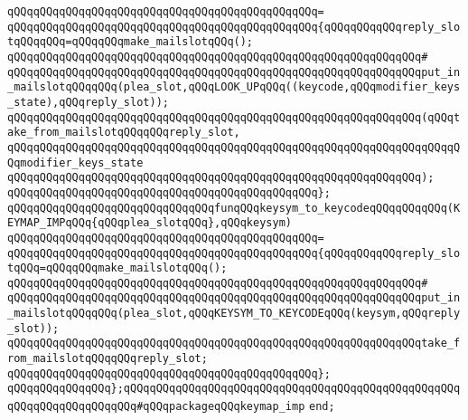 \verb|qQQqqQQqqQQqqQQqqQQqqQQqqQQqqQQqqQQqqQQqqQQqqQQq=|\newline
\verb|qQQqqQQqqQQqqQQqqQQqqQQqqQQqqQQqqQQqqQQqqQQqqQQq{qQQqqQQqqQQqreply_slotqQQqqQQq=qQQqqQQqmake_mailslotqQQq();|\newline
\verb|qQQqqQQqqQQqqQQqqQQqqQQqqQQqqQQqqQQqqQQqqQQqqQQqqQQqqQQqqQQqqQQq#|\newline
\verb|qQQqqQQqqQQqqQQqqQQqqQQqqQQqqQQqqQQqqQQqqQQqqQQqqQQqqQQqqQQqqQQqput_in_mailslotqQQqqQQq(plea_slot,qQQqLOOK_UPqQQq((keycode,qQQqmodifier_keys_state),qQQqreply_slot));|\newline
\newline
\verb|qQQqqQQqqQQqqQQqqQQqqQQqqQQqqQQqqQQqqQQqqQQqqQQqqQQqqQQqqQQqqQQq(qQQqtake_from_mailslotqQQqqQQqreply_slot,|\newline
\verb|qQQqqQQqqQQqqQQqqQQqqQQqqQQqqQQqqQQqqQQqqQQqqQQqqQQqqQQqqQQqqQQqqQQqqQQqmodifier_keys_state|\newline
\verb|qQQqqQQqqQQqqQQqqQQqqQQqqQQqqQQqqQQqqQQqqQQqqQQqqQQqqQQqqQQqqQQq);|\newline
\verb|qQQqqQQqqQQqqQQqqQQqqQQqqQQqqQQqqQQqqQQqqQQqqQQq};|\newline
\newline
\verb|qQQqqQQqqQQqqQQqqQQqqQQqqQQqqQQqfunqQQqkeysym_to_keycodeqQQqqQQqqQQq(KEYMAP_IMPqQQq{qQQqplea_slotqQQq},qQQqkeysym)|\newline
\verb|qQQqqQQqqQQqqQQqqQQqqQQqqQQqqQQqqQQqqQQqqQQqqQQq=|\newline
\verb|qQQqqQQqqQQqqQQqqQQqqQQqqQQqqQQqqQQqqQQqqQQqqQQq{qQQqqQQqqQQqreply_slotqQQq=qQQqqQQqmake_mailslotqQQq();|\newline
\verb|qQQqqQQqqQQqqQQqqQQqqQQqqQQqqQQqqQQqqQQqqQQqqQQqqQQqqQQqqQQqqQQq#|\newline
\verb|qQQqqQQqqQQqqQQqqQQqqQQqqQQqqQQqqQQqqQQqqQQqqQQqqQQqqQQqqQQqqQQqput_in_mailslotqQQqqQQq(plea_slot,qQQqKEYSYM_TO_KEYCODEqQQq(keysym,qQQqreply_slot));|\newline
\newline
\verb|qQQqqQQqqQQqqQQqqQQqqQQqqQQqqQQqqQQqqQQqqQQqqQQqqQQqqQQqqQQqqQQqtake_from_mailslotqQQqqQQqreply_slot;|\newline
\verb|qQQqqQQqqQQqqQQqqQQqqQQqqQQqqQQqqQQqqQQqqQQqqQQq};|\newline
\verb|qQQqqQQqqQQqqQQq};qQQqqQQqqQQqqQQqqQQqqQQqqQQqqQQqqQQqqQQqqQQqqQQqqQQqqQQqqQQqqQQqqQQqqQQq#qQQqpackageqQQqkeymap_imp|\newline
\newline
\verb|end;|\newline
\newline

